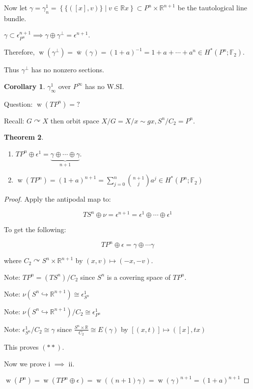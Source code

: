 \documentclass{article}
\theoremstyle{definition}
\newtheorem{theorem}{Theorem}
\newtheorem{corollary}[theorem]{Corollary}
\begin{document}
    Now let \(\gamma=\gamma^1_n = \left\{ \{ ([x],v) \} \mid v\in \mathbb{R}x \right\} \subset P^n \times \mathbb{R}^{n+1}\) be the tautological line bundle.

    \(\gamma \subset \epsilon^{n+1}_{P^n} \implies \gamma \oplus \gamma^{\perp} =\epsilon^{n+1} \).

    Therefore, \(\operatorname{w}(\gamma^{\perp}) = \overline{\operatorname{w}}(\gamma) = (1+a)^{-1} = 1 + a + \cdots + a^n \in H^{\ast} (P^n;\mathbb{F}_2)\). 

    Thus \(\gamma^{\perp}\) has no nonzero sections.

    \begin{corollary}
        \(\gamma^1_\infty\) over \(P^{\infty}\) has no W.SI.
    \end{corollary}

    Question: \(\operatorname{w}(TP^n) = ?\) 

    Recall: \(G \curvearrowright X\) then orbit space \(X / G = X / x \sim gx, S^n / C_2 = P^n\).

    \begin{theorem}
        \begin{enumerate}[label=\roman*)]
            \item \(TP^n \oplus \epsilon^1 = \underbrace{\gamma \oplus \cdots \oplus \gamma}_{n+1}\).
            \item \(\operatorname{w} (TP^n) = (1+a)^{n+1} = \sum_{j=0}^n \binom{n+1}{j} a^j \in H^{\ast} (P^n;\mathbb{F}_2) \)
        \end{enumerate} 
    \end{theorem}

    \begin{proof}
        Apply the antipodal map to:

        \[
            TS^n \oplus \nu = \epsilon^{n+1} = \epsilon ^1 \oplus \cdots \oplus \epsilon^1 \tag{\(\ast\)}
        \]

        To get the following:

        \[
            TP^n \oplus \epsilon = \gamma \oplus \cdots \gamma \tag{\(\ast \ast\)}
        \]

        where \(C_2 \curvearrowright S^n \times \mathbb{R}^{n+1}\) by \((x,v) \mapsto (-x,-v)\).

        Note: \(TP^n = (TS^n) / C_2\) since \(S^n\) is a covering space of \(TP^n\).

        Note: \(\nu(S^n \hookrightarrow \mathbb{R}^{n+1}) \cong \epsilon^1_{S^n}\)
        
        Note: \(\nu(S^n \hookrightarrow \mathbb{R}^{n+1}) / C_2 \cong \epsilon^1_{P^n}\)
        
        Note: \(\epsilon^1_{S^n} / C_2 \cong \gamma\) since \(\frac{S^n \times \mathbb{R}}{C_2} \cong E(\gamma)\) by \([(x,t)] \mapsto ([x],tx)\) 

        This proves \((\ast \ast)\).

        Now we prove i \(\implies\) ii.

        \(\operatorname{w}(P^n) = \operatorname{w}(TP^n \oplus \epsilon) = \operatorname{w}((n+1)\gamma) = \operatorname{w}(\gamma)^{n+1} = (1+a)^{n+1}\) 

    \end{proof}
\end{document}
